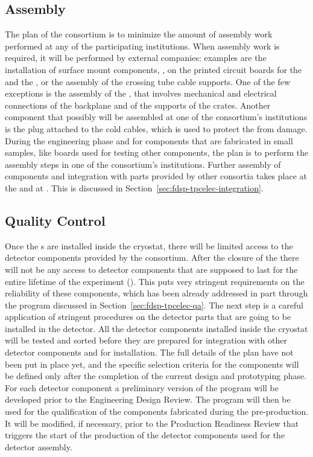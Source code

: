 \subsection{Assembly}
\label{sec:fdsp-tpcelec-production-assembly}

The plan of the  consortium is to minimize
the amount of assembly work performed at any of the participating
institutions. When assembly work is required, it will be performed
by external companies: examples are the installation of surface 
mount components, ,  on the printed 
circuit boards for the  and the , or
the assembly of the crossing tube cable supports. One of the few
exceptions is the assembly of the , that involves
mechanical and electrical connections of the backplane and of
the supports of the crates. Another component that possibly 
will be assembled at one of the consortium's institutions is
the plug attached to the cold cables, which is used to protect 
the  from  damage. During the engineering
phase and for components that are fabricated in small samples, 
like boards used for testing other components, the plan is to
perform the assembly steps in one of the consortium's institutions.
Further assembly of components and integration with parts
provided by other consortia takes place at the  and
at \surf. This is discussed in Section~\ref{sec:fdsp-tpcelec-integration}.

\subsection{Quality Control}
\label{sec:fdsp-tpcelec-production-qc}

Once the s are installed inside the cryostat, there will
be limited access to the detector components provided by the 
consortium. After the closure of the  there will not
be any access to detector components that are supposed to
last for the entire lifetime of the experiment (\dunelifetime). This
puts very stringent requirements on the reliability of these
components, which has been already addressed in part through 
the  program discussed in Section~\ref{sec:fdsp-tpcelec-qa}. The
next step is a careful application of stringent  procedures on the 
detector parts that are going to be installed in the detector.
All the detector components installed inside the cryostat will
be tested and sorted before they are prepared for integration
with other detector components and for installation. The full
details of the  plan have not been put in place
yet, and the specific selection criteria for the components will
be defined only after the completion of the current design and
prototyping phase. For each detector component a preliminary
version of the  program will be developed prior
to the Engineering Design Review. The program will then be used for
the qualification of the components fabricated during the 
pre-production. It will be modified, if necessary, prior to the Production
Readiness Review that triggers the start of the production of the
detector components used for the detector assembly.

